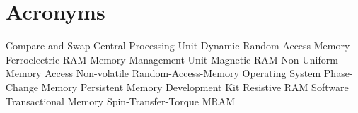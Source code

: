 \chapter{Acronyms}
\label{sec:acronyms}
%
\begin{multicols}{2}
\begin{acronym}		%
%
%	
          {Compare and Swap}
          {Central Processing Unit}
         {Dynamic Random-Access-Memory}
        {Ferroelectric RAM}
          {Memory Management Unit}
         {Magnetic RAM}
         {Non-Uniform Memory Access}
        {Non-volatile Random-Access-Memory}
           {Operating System}
          {Phase-Change Memory}
         {Persistent Memory Development Kit}
         {Resistive RAM}
          {Software Transactional Memory}
     {Spin-Transfer-Torque MRAM}
%	
%	
\end{acronym}
\end{multicols}
%

